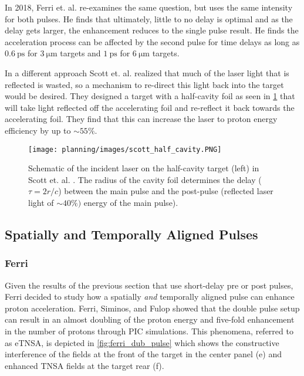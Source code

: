 In 2018, Ferri et. al. \cite{Ferri_2018_PoP} re-examines the same question, but uses the same intensity for both pulses. He finds that ultimately, little to no delay is optimal and as the delay gets larger, the enhancement reduces to the single pulse result. He finds the acceleration process can be affected by the second pulse for time delays as long as $\SI{0.6}{\pico \second}$ for $\SI{3}{\micro \meter}$ targets and $\SI{1}{\pico \second}$ for $\SI{6}{\micro \meter}$ targets. 

In a different approach Scott et. al. \cite{Scott_2012_APL} realized that much of the laser light that is reflected is wasted, so a mechanism to re-direct this light back into the target would be desired. They designed a target with a half-cavity foil as seen in \cref{fig:scott_half_cavity} that will take light reflected off the accelerating foil and re-reflect it back towards the accelerating foil. They find that this can increase the laser to proton energy efficiency by up to $\sim 55 \%$.

\begin{figure}
	\centering 
	\texttt{[image: planning/images/scott\_half\_cavity.PNG]}
	\caption{Schematic of the incident laser on the half-cavity target (left) in Scott et. al. \cite{Scott_2012_APL}. The radius of the cavity foil determines the delay ($\tau = 2 r/c$) between the main pulse and the post-pulse (reflected laser light of $\sim 40 \%)$ energy of the main pulse).}
	\label{fig:scott_half_cavity}
\end{figure}



\subsection{Spatially and Temporally Aligned Pulses}

\subsubsection{Ferri}
Given the results of the previous section \cite{Markey_2010_PRL,Scott_2012_APL,Ferri_2018_PoP} that use short-delay pre or post pulses, Ferri decided to study how a spatially \emph{and} temporally aligned pulse can enhance proton acceleration. Ferri, Siminos, and Fulop showed that the double pulse setup can result in an almost doubling of the proton energy and five-fold enhancement in the number of protons \cite{Ferri_2019_Nat_Comm} through PIC simulations. This phenomena, referred to as eTNSA, is depicted in \cref{fig:ferri_dub_pulse} which shows the constructive interference of the fields at the front of the target in the center panel (e) and enhanced TNSA fields at the target rear (f).

